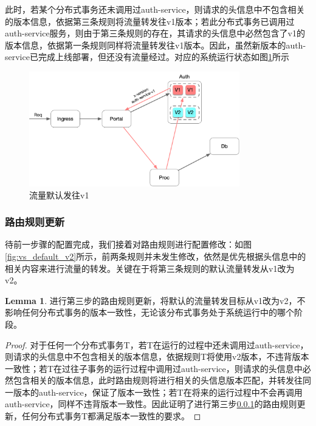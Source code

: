 \documentclass[12pt,a4paper]{article}
\theoremstyle{definition}
\newtheorem{lemma}{Lemma}
\begin{document}
此时，若某个分布式事务还未调用过auth-service，则请求的头信息中不包含相关的版本信息，依据第三条规则将流量转发往v1版本；若此分布式事务已调用过auth-service服务，则由于第三条规则的存在，其请求的头信息中必然包含了v1的版本信息，依据第一条规则同样将流量转发往v1版本。因此，虽然新版本的auth-service已完成上线部署，但还没有流量经过。对应的系统运行状态如图\ref{fig:traffic_default_v1}所示
\begin{figure}[ht]
 \centering
 \includegraphics[height=5cm]{images/traffic_default_v1.png}
 \caption{流量默认发往v1}
 \label{fig:traffic_default_v1}
\end{figure}

\subsubsection{路由规则更新}\label{section:update_route}
待前一步骤的配置完成，我们接着对路由规则进行配置修改：如图\ref{fig:vs_default_v2}所示，前两条规则并未发生修改，依然是优先根据头信息中的相关内容来进行流量的转发。关键在于将第三条规则的默认流量转发从v1改为v2。

\begin{lemma}
进行第三步的路由规则更新，将默认的流量转发目标从v1改为v2，不影响任何分布式事务的版本一致性，无论该分布式事务处于系统运行中的哪个阶段。
\end{lemma}

\begin{proof}
对于任何一个分布式事务T，若T在运行的过程中还未调用过auth-service，则请求的头信息中不包含相关的版本信息，依据规则T将使用v2版本，不违背版本一致性；若T在过往子事务的运行过程中调用过auth-service，则请求的头信息中必然包含相关的版本信息，此时路由规则将进行相关的头信息版本匹配，并转发往同一版本的auth-service，保证了版本一致性；若T在将来的运行过程中不会再调用auth-service，同样不违背版本一致性。因此证明了进行第三步\ref{section:update_route}的路由规则更新，任何分布式事务T都满足版本一致性的要求。
\end{proof}
\end{document}
